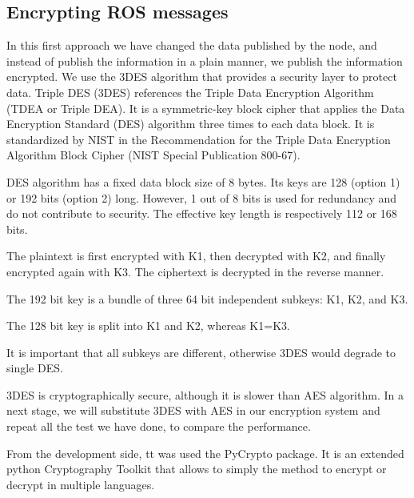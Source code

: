 \documentclass[journal,twoside]{JoPhA}
\begin{document}


\subsection{Encrypting ROS messages}



In this first approach we have changed the data published by the node, and instead of publish the information in a plain manner, we publish the information encrypted. We use the 3DES algorithm that provides a security layer to protect data.
Triple DES (3DES) references the Triple Data Encryption Algorithm (TDEA or Triple DEA). It is a symmetric-key block cipher that applies the Data Encryption Standard (DES) algorithm three times to each data block. It is standardized by NIST in the Recommendation for the Triple Data Encryption Algorithm Block Cipher (NIST Special Publication 800-67).

DES algorithm has a fixed data block size of 8 bytes. Its keys are 128 (option 1) or 192 bits (option 2) long. However, 1 out of 8 bits is used for redundancy and do not contribute to security. The effective key length is respectively 112 or 168 bits.

The plaintext is first encrypted with K1, then decrypted with K2, and finally encrypted again with K3. The ciphertext is decrypted in the reverse manner.

The 192 bit key is a bundle of three 64 bit independent subkeys: K1, K2, and K3.

The 128 bit key is split into K1 and K2, whereas K1=K3.

It is important that all subkeys are different, otherwise 3DES would degrade to single DES.

3DES is cryptographically secure, although it is slower than AES algorithm. In a next stage, we will substitute 3DES with AES in our encryption system and repeat all the test we have done, to compare the performance.


From the development side, tt was used the PyCrypto package. It is an extended python Cryptography Toolkit that allows to simply the method to encrypt or decrypt in multiple languages. 
\end{document}
